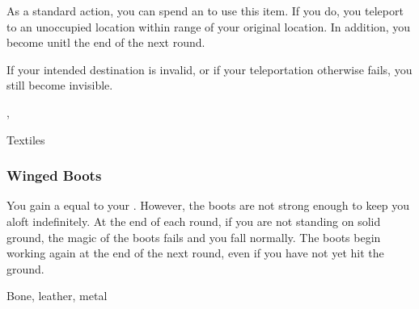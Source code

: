 As a standard action, you can spend an  to use this item.
If you do, you teleport to an unoccupied location within \rngmed range of your original location.
In addition, you become  unitl the end of the next round.

If your intended destination is invalid, or if your teleportation otherwise fails, you still become invisible.



 , 


 Textiles


\lowercase{\hypertarget{item:Winged Boots}{}}\label{item:Winged Boots}
\hypertarget{item:Winged Boots}{\subsubsection{Winged Boots\hfill{}}}

You gain a  equal to your .
However, the boots are not strong enough to keep you aloft indefinitely.
At the end of each round, if you are not standing on solid ground, the magic of the boots fails and you fall normally.
The boots begin working again at the end of the next round, even if you have not yet hit the ground.



 Bone, leather, metal
